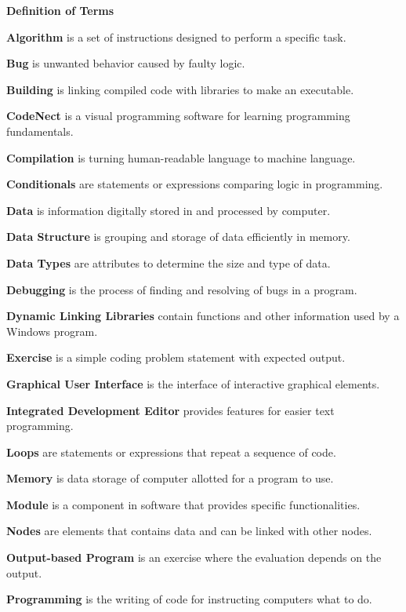 \flushleft
\textbf{Definition of Terms}\\
\justifying

\parx
\textbf{Algorithm} is a set of instructions designed to perform a specific task.

\parx
\textbf{Bug} is unwanted behavior caused by faulty logic.

\parx
\textbf{Building} is linking compiled code with libraries to make an executable.

\parx
\textbf{CodeNect} is a visual programming software for learning programming fundamentals.

\parx
\textbf{Compilation} is turning human-readable language to machine language.

\parx
\textbf{Conditionals} are statements or expressions comparing logic in programming.

\parx
\textbf{Data} is information digitally stored in and processed by computer.

\parx
\textbf{Data Structure} is grouping and storage of data efficiently in memory.

\parx
\textbf{Data Types} are attributes to determine the size and type of data.

\parx
\textbf{Debugging} is the process of finding and resolving of bugs in a program.

\parx
\textbf{Dynamic Linking Libraries} contain functions and other information used
by a Windows program.

\parx
\textbf{Exercise} is a simple coding problem statement with expected output.

\parx
\textbf{Graphical User Interface} is the interface of interactive graphical elements.

\parx
\textbf{Integrated Development Editor} provides features for easier text programming.

\parx
\textbf{Loops} are statements or expressions that repeat a sequence of code.

\parx
\textbf{Memory} is data storage of computer allotted for a program to use.

\parx
\textbf{Module} is a component in software that provides specific functionalities.

\parx
\textbf{Nodes} are elements that contains data and can be linked with other nodes.

\parx
\textbf{Output-based Program} is an exercise where the evaluation depends on the output.

\parx
\textbf{Programming} is the writing of code for instructing computers what to do.

